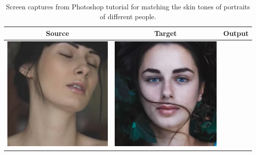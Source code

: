 \begin{table}[H]
    \centering
    \caption{Screen captures from Photoshop tutorial for matching the skin tones of portraits of different people. \label{tab:match_other_demo}}
\begin{tabular}{|c|c|c|}
    \hline
    Source & Target & Output \\
    \hline
  \begin{minipage}{.29\textwidth}
    \includegraphics[width=\textwidth,height=\textheight,keepaspectratio]{images/match_other_1_orig}
  \end{minipage} & 
  \begin{minipage}{.29\textwidth}
    \includegraphics[width=\textwidth,height=\textheight,keepaspectratio]{images/match_other_1_targ}

\end{minipage}
\end{tabular}
\end{table}

